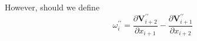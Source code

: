 \documentclass{warpdoc}
\newcommand{\nd}{{{n}_{\rm d}}}
\begin{document}
%
However, should we define
%
\begin{equation}
 \omega_i^{\prime\prime}
       =  \frac{\partial \bm{V}_{i+2}^{\prime\prime}}{\partial x_{i+1}}
         -\frac{\partial \bm{V}_{i+1}^{\prime\prime}}{\partial x_{i+2}}
\end{equation}
%
%
%
%
%
%
%
%
%
\end{document}
